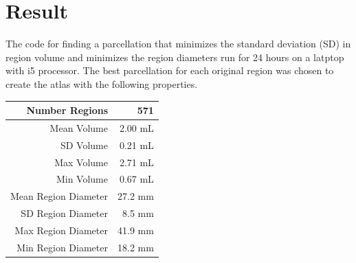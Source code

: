 \documentclass[12pt, a4paper]{article}
\begin{document}
\newpage
\section{Result}
The code for finding a parcellation that minimizes the standard deviation (SD) in region volume and minimizes the region diameters run for 24 hours on a latptop with i5 processor. The best parcellation for each original region was chosen to create the atlas with the following properties.
\begin{center}
\begin{tabular}{r|r}
Number Regions& 571 \\
\hline \hline
Mean Volume & 2.00 mL \\
\hline 
SD Volume& 0.21 mL \\
\hline
Max Volume & 2.71 mL\\
\hline 
Min Volume & 0.67 mL\\
\hline \hline
Mean Region Diameter & 27.2 mm \\
\hline 
SD Region Diameter & 8.5 mm\\
\hline
Max Region Diameter & 41.9 mm\\
\hline
Min Region Diameter & 18.2 mm
\end{tabular}
\end{center}
\end{document}
